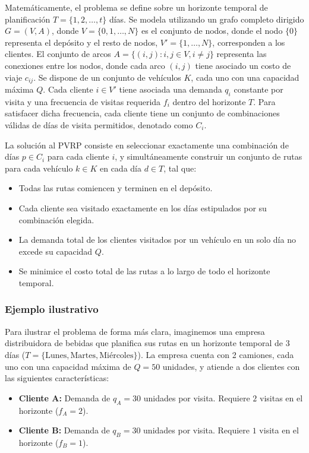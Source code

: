 Matemáticamente, el problema se define sobre un horizonte temporal de planificación $T = \{1, 2, \dots, t\}$ días. Se modela utilizando un grafo completo dirigido $G = (V, A)$, donde $V = \{0, 1, \dots, N\}$ es el conjunto de nodos, donde el nodo $\{0\}$ representa el depósito y el resto de nodos, $V' = \{1, \dots, N\}$, corresponden a los clientes. El conjunto de arcos $A = \{(i,j) : i,j \in V, i \neq j\}$ representa las conexiones entre los nodos, donde cada arco $(i,j)$ tiene asociado un costo de viaje $c_{ij}$. Se dispone de un conjunto de vehículos $K$, cada uno con una capacidad máxima $Q$. Cada cliente $i \in V'$ tiene asociada una demanda $q_{i}$ constante por visita y una frecuencia de visitas requerida $f_{i}$ dentro del horizonte $T$. Para satisfacer dicha frecuencia, cada cliente tiene un conjunto de combinaciones válidas de días de visita permitidos, denotado como $C_{i}$.

La solución al PVRP consiste en seleccionar exactamente una combinación de días $p \in C_{i}$ para cada cliente $i$, y simultáneamente construir un conjunto de rutas para cada vehículo $k \in K$ en cada día $d \in T$, tal que:
\begin{itemize}
    \item Todas las rutas comiencen y terminen en el depósito.
    \item Cada cliente sea visitado exactamente en los días estipulados por su combinación elegida.
    \item La demanda total de los clientes visitados por un vehículo en un solo día no excede su capacidad $Q$.
    \item Se minimice el costo total de las rutas a lo largo de todo el horizonte temporal.
\end{itemize}

\subsubsection{Ejemplo ilustrativo}
Para ilustrar el problema de forma más clara, imaginemos una empresa distribuidora de bebidas que planifica sus rutas en un horizonte temporal de 3 días ($T = \{\text{Lunes}, \text{Martes}, \text{Miércoles}\}$). La empresa cuenta con 2 camiones, cada uno con una capacidad máxima de $Q = 50$ unidades, y atiende a dos clientes con las siguientes características:

\begin{itemize}
    \item \textbf{Cliente A:} Demanda de $q_A = 30$ unidades por visita. Requiere $2$ visitas en el horizonte ($f_A = 2$). 
    
    \item \textbf{Cliente B:} Demanda de $q_B = 30$ unidades por visita. Requiere $1$ visita en el horizonte ($f_B = 1$). 
\end{itemize}

